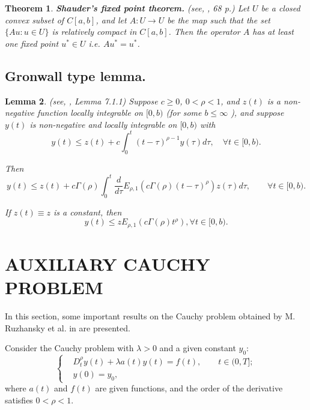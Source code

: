 \documentclass[reqno]{amsart}
\newtheorem{thm}{Theorem}[section]
\newtheorem{lem}[thm]{Lemma}
\theoremstyle{definition}
\numberwithin{equation}{section}
\begin{document}
\begin{thm} \label{thm2.6} \textbf{Shauder's fixed point theorem.} (see, \cite{KilbasSrivstavaTrujillo}, 68 p.)  Let $U$ be a closed convex subset of $C[a, b]$, and let $A: U \rightarrow U$ be the map such that the set $\{A u: u \in U\}$ is relatively compact in $C[a, b]$. Then the operator $A$ has at least one fixed point $u^* \in U$ i.e. $A u^*=u^*$.
\end{thm}

\subsection{Gronwall type lemma.} 

\begin{lem}\label{lem2.7} (see, \cite{Henry}, Lemma 7.1.1) Suppose $c\geq 0$, $0<\rho<1$, and $z(t)$ is a non-negative function locally integrable on $[0, b)$ (for some $b \leq \infty$ ), and suppose $y(t)$ is non-negative and locally integrable on $[0, b)$ with
$$
y(t) \leq z(t)+c \int_0^t(t-\tau)^{\rho-1} y(\tau) d \tau, \quad \forall t \in[0, b).
$$

Then
$$
y(t) \leq z(t)+c \Gamma(\rho) \int_0^t \frac{d}{d \tau} E_{\rho, 1}\left(c \Gamma(\rho)(t-\tau)^\rho\right) z(\tau) d \tau, \qquad \forall t \in[0, b).
$$

If $z(t) \equiv z$ is a constant, then
$$
y(t) \leq z E_{\rho, 1}\left(c \Gamma(\rho) t^\rho\right), \forall t \in[0, b) .
$$
\end{lem}

\section{AUXILIARY CAUCHY PROBLEM} 

In this section, some important results on the Cauchy problem obtained by M. Ruzhansky et al. in \cite{SerikbaevRuzhanskyTokmagambetov} are presented.

Consider the Cauchy problem with $\lambda > 0$ and a given constant $y_0$:
\begin{equation}\label{3.1}
\left\{
\begin{aligned}
    & D_{t}^{\rho }y(t)+\lambda a(t)y(t)=f(t), \qquad t\in (0,T]; \\
    & y(0) = y_0,
\end{aligned}
\right.
\end{equation}
where $a(t)$ and $f(t)$ are given functions, and the order of the derivative satisfies $0 < \rho < 1$.
\end{document}
